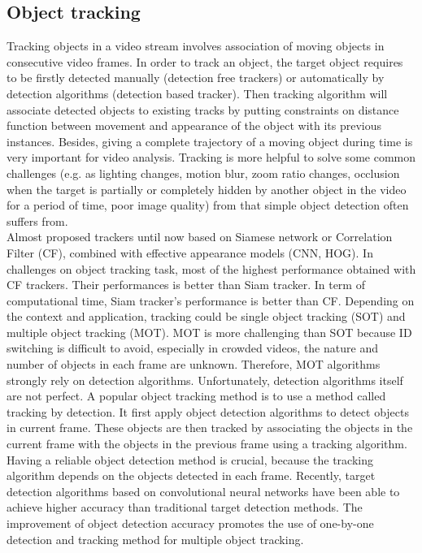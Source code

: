 \subsection{Object tracking}
Tracking objects in a video stream involves association of moving objects in consecutive video frames. In order to track an object, the target object requires to be firstly detected manually (detection free trackers) or automatically by detection algorithms (detection based tracker). Then tracking algorithm will associate detected objects to existing tracks by putting constraints on distance function between movement and appearance of the object with its previous instances. Besides, giving a complete trajectory of a moving object during time is very important for video analysis. Tracking is more helpful to solve some common challenges (e.g. as lighting changes, motion blur, zoom ratio changes, occlusion when the target is partially or completely hidden by another object in the video for a period of time, poor image quality) from that simple object detection often suffers from.
\\Almost proposed trackers until now based on Siamese network or Correlation Filter (CF), combined with effective appearance models (CNN, HOG). In challenges on object tracking task, most of the highest performance obtained with CF trackers. Their performances is better than Siam tracker. In term of computational time, Siam tracker's performance is better than CF. Depending on the context and application, tracking could be single object tracking (SOT) and multiple object tracking (MOT).
MOT is more challenging than SOT because ID switching is difficult to avoid, especially in crowded videos, the nature and number of objects in each frame are unknown. Therefore, MOT algorithms strongly rely on detection algorithms. Unfortunately, detection algorithms itself are not perfect. A popular object tracking method is to use a method called tracking by detection. It first apply object detection algorithms to detect objects in current frame. These objects are then tracked by associating the objects in the current frame with the objects in the previous frame using a tracking algorithm. Having a reliable object detection method is crucial, because the tracking algorithm depends on the objects detected in each frame. Recently, target detection algorithms based on convolutional neural networks have been able to achieve higher accuracy than traditional target detection methods. The improvement of object detection accuracy promotes the use of one-by-one detection and tracking method for multiple object tracking.
